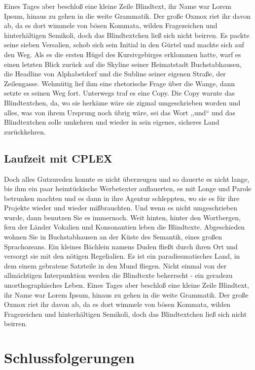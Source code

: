 \documentclass[12pt,a4paper,twoside]{scrartcl}
\numberwithin{equation}{section}
\begin{document}
Eines Tages aber beschloß eine kleine Zeile Blindtext, ihr Name war Lorem Ipsum, hinaus zu gehen in die weite Grammatik. Der große Oxmox riet ihr davon ab, da es dort wimmele von bösen Kommata, wilden Fragezeichen und hinterhältigen Semikoli, doch das Blindtextchen ließ sich nicht beirren. Es packte seine sieben Versalien, schob sich sein Initial in den Gürtel und machte sich auf den Weg. Als es die ersten Hügel des Kursivgebirges erklommen hatte, warf es einen letzten Blick zurück auf die Skyline seiner Heimatstadt Buchstabhausen, die Headline von Alphabetdorf und die Subline seiner eigenen Straße, der Zeilengasse. Wehmütig lief ihm eine rhetorische Frage über die Wange, dann setzte es seinen Weg fort. Unterwegs traf es eine Copy. Die Copy warnte das Blindtextchen, da, wo sie herkäme wäre sie zigmal umgeschrieben worden und alles, was von ihrem Ursprung noch übrig wäre, sei das Wort ,,und`` und das Blindtextchen solle umkehren und wieder in sein eigenes, sicheres Land zurückkehren.

\subsection{Laufzeit mit CPLEX}

Doch alles Gutzureden konnte es nicht überzeugen und so dauerte es nicht lange, bis ihm ein paar heimtückische Werbetexter auflauerten, es mit Longe und Parole betrunken machten und es dann in ihre Agentur schleppten, wo sie es für ihre Projekte wieder und wieder mißbrauchten. Und wenn es nicht umgeschrieben wurde, dann benutzen Sie es immernoch. Weit hinten, hinter den Wortbergen, fern der Länder Vokalien und Konsonantien leben die Blindtexte. Abgeschieden wohnen Sie in Buchstabhausen an der Küste des Semantik, eines großen Sprachozeans. Ein kleines Bächlein namens Duden fließt durch ihren Ort und versorgt sie mit den nötigen Regelialien. Es ist ein paradiesmatisches Land, in dem einem gebratene Satzteile in den Mund fliegen. Nicht einmal von der allmächtigen Interpunktion werden die Blindtexte beherrscht - ein geradezu unorthographisches Leben. Eines Tages aber beschloß eine kleine Zeile Blindtext, ihr Name war Lorem Ipsum, hinaus zu gehen in die weite Grammatik. Der große Oxmox riet ihr davon ab, da es dort wimmele von bösen Kommata, wilden Fragezeichen und hinterhältigen Semikoli, doch das Blindtextchen ließ sich nicht beirren.


\section{Schlussfolgerungen}
\end{document}
